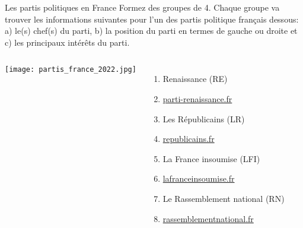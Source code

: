 \begin{frame}{Les partis politiques en France}
  \small
  Formez des groupes de 4.
  Chaque groupe va trouver les informations suivantes pour l'un des partis politique français dessous: a) le(s) chef(s) du parti, b) la position du parti en termes de gauche ou droite et c) les principaux intérêts du parti.
  \begin{columns}
      \begin{center}
        \texttt{[image: partis\_france\_2022.jpg]}
      \end{center}
      \begin{enumerate}
        \item Renaissance (RE)
        \item[] \href{https://parti-renaissance.fr/}{parti-renaissance.fr}
        \item Les Républicains (LR)
        \item[] \href{https://republicains.fr/}{republicains.fr}
        \item La France insoumise (LFI)
        \item[] \href{https://lafranceinsoumise.fr/}{lafranceinsoumise.fr}
        \item Le Rassemblement national (RN)
        \item[] \href{https://rassemblementnational.fr/}{rassemblementnational.fr}
      \end{enumerate}
  \end{columns}
\end{frame}